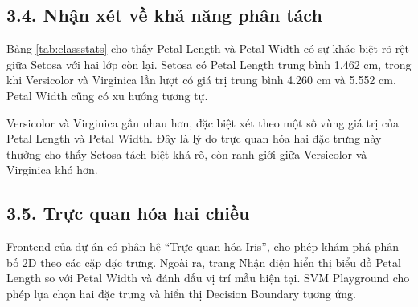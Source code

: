 \documentclass{article}
\begin{document}
	\subsection{3.4. Nhận xét về khả năng phân tách}
	\hspace{0.5cm}
	Bảng \ref{tab:classstats} cho thấy Petal Length và Petal Width có sự khác biệt rõ rệt giữa Setosa với hai lớp còn lại. Setosa có Petal Length trung bình 1.462 cm, trong khi Versicolor và Virginica lần lượt có giá trị trung bình 4.260 cm và 5.552 cm. Petal Width cũng có xu hướng tương tự.
	
	Versicolor và Virginica gần nhau hơn, đặc biệt xét theo một số vùng giá trị của Petal Length và Petal Width. Đây là lý do trực quan hóa hai đặc trưng này thường cho thấy Setosa tách biệt khá rõ, còn ranh giới giữa Versicolor và Virginica khó hơn.
	
	\subsection{3.5. Trực quan hóa hai chiều}
	\hspace{0.5cm}
	Frontend của dự án có phân hệ ``Trực quan hóa Iris'', cho phép khám phá phân bố 2D theo các cặp đặc trưng. Ngoài ra, trang Nhận diện hiển thị biểu đồ Petal Length so với Petal Width và đánh dấu vị trí mẫu hiện tại. SVM Playground cho phép lựa chọn hai đặc trưng và hiển thị Decision Boundary tương ứng.
	
\end{document}
